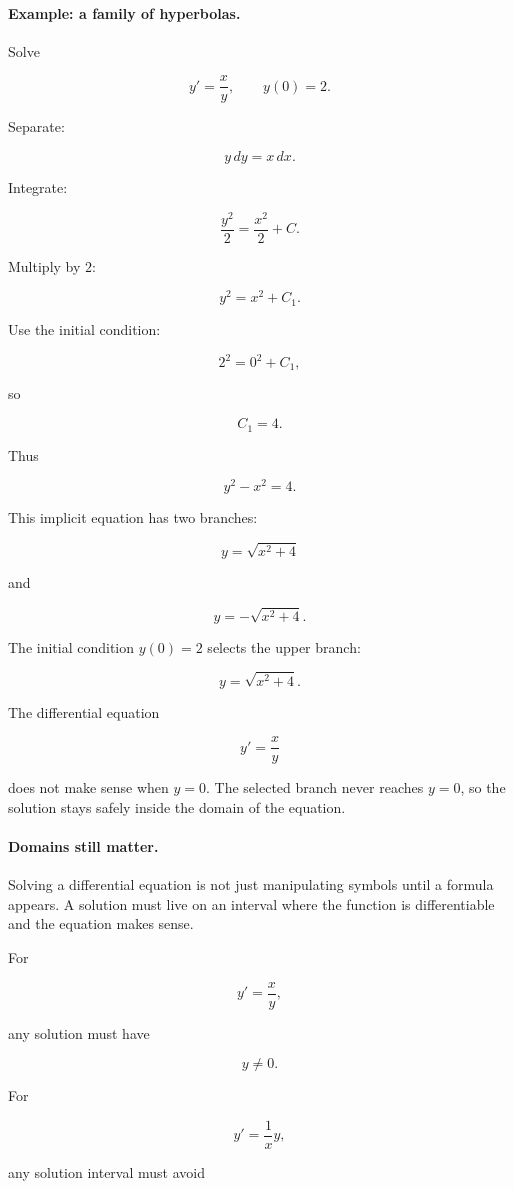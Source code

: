 \paragraph{Example: a family of hyperbolas.}
Solve

\[
y'=\frac{x}{y},
\qquad
y(0)=2.
\]

Separate:

\[
y\,dy=x\,dx.
\]

Integrate:

\[
\frac{y^2}{2}=\frac{x^2}{2}+C.
\]

Multiply by \(2\):

\[
y^2=x^2+C_1.
\]

Use the initial condition:

\[
2^2=0^2+C_1,
\]

so

\[
C_1=4.
\]

Thus

\[
\boxed{
y^2-x^2=4.
}
\]

This implicit equation has two branches:

\[
y=\sqrt{x^2+4}
\]

and

\[
y=-\sqrt{x^2+4}.
\]

The initial condition \(y(0)=2\) selects the upper branch:

\[
\boxed{
y=\sqrt{x^2+4}.
}
\]

The differential equation

\[
y'=\frac{x}{y}
\]

does not make sense when \(y=0\).  The selected branch never reaches \(y=0\), so the
solution stays safely inside the domain of the equation.

\paragraph{Domains still matter.}
Solving a differential equation is not just manipulating symbols until a formula appears.
A solution must live on an interval where the function is differentiable and the equation
makes sense.

For

\[
y'=\frac{x}{y},
\]

any solution must have

\[
y\neq0.
\]

For

\[
y'=\frac{1}{x}y,
\]

any solution interval must avoid

